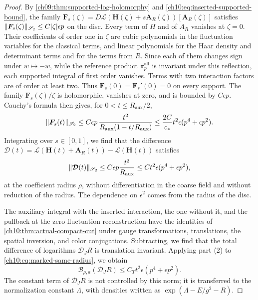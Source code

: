 \begin{proof}
By \cref{ch09:thm:supported-log-holomorphy} and \eqref{ch10:eq:inserted-supported-bound}, the family $\boldsymbol F_s(\zeta)=D\boldsymbol{\mathcal L}(\boldsymbol H(\zeta)+s\boldsymbol A_R(\zeta))[\boldsymbol A_R(\zeta)]$ satisfies $\lVert \boldsymbol F_s(\zeta)\rVert_{\mathscr S_2}\le C\lvert \zeta\rvert\epsilon p$ on the disc. Every term of $H$ and of $A_R$ vanishes at $\zeta=0$. Their coefficients of order one in $\zeta$ are cubic polynomials in the fluctuation variables for the classical terms, and linear polynomials for the Haar density and determinant terms and for the terms from $R$. Since each of them changes sign under $w\mapsto-w$, while the reference product $\pi_p^{\mathrm{all}}$ is invariant under this reflection, each supported integral of first order vanishes. Terms with two interaction factors are of order at least two. Thus $\boldsymbol F_s(0)=\boldsymbol F_s'(0)=0$ on every support. The family $\boldsymbol F_s(\zeta)/\zeta$ is holomorphic, vanishes at zero, and is bounded by $C\epsilon p$. Cauchy's formula then gives, for $0<t\le R_{\mathrm{aux}}/2$,
\[
 \lVert \boldsymbol F_s(t)\rVert_{\mathscr S_2}\le C\epsilon p\,\frac{t^2}{R_{\mathrm{aux}}(1-t/R_{\mathrm{aux}})}\le\frac{2C}{c_*}t^2\epsilon(p^4+\epsilon p^2).
\]
Integrating over $s\in[0,1]$, we find that the difference $\boldsymbol{\mathcal D}(t)=\boldsymbol{\mathcal L}(\boldsymbol H(t)+\boldsymbol A_R(t))-\boldsymbol{\mathcal L}(\boldsymbol H(t))$ satisfies
\begin{equation}\label{ch10:eq:marked-same-radius}
 \lVert \boldsymbol{\mathcal D}(t)\rVert_{\mathscr S_2}\le C\epsilon p\frac{t^2}{R_{\mathrm{aux}}}\le Ct^2\epsilon(p^4+\epsilon p^2),
\end{equation}
at the coefficient radius $\rho$, without differentiation in the coarse field and without reduction of the radius. The dependence on $\epsilon^2$ comes from the radius of the disc.

The auxiliary integral with the inserted interaction, the one without it, and the pullback at the zero-fluctuation reconstruction have the identities of \cref{ch10:thm:actual-compact-cut} under gauge transformations, translations, the spatial inversion, and color conjugations. Subtracting, we find that the total difference of logarithms $\mathcal D_JR$ is translation invariant. Applying part (2) to \eqref{ch10:eq:marked-same-radius}, we obtain
\[
 \mathcal B_{\rho,a}(\mathcal D_JR)\le C_Tt^2\epsilon(p^4+\epsilon p^2).
\]
The constant term of $\mathcal D_JR$ is not controlled by this norm; it is transferred to the normalization constant $\Lambda$, with densities written as $\exp(\Lambda-E/g^2-R)$.


\end{proof}
